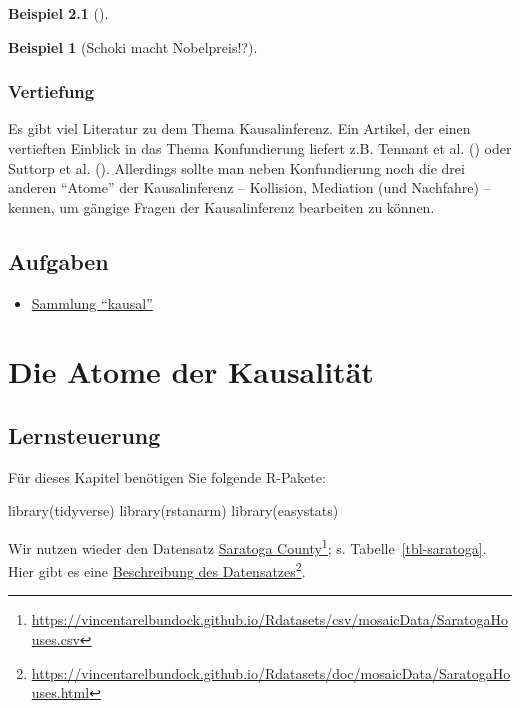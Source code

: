 \documentclass[
  ngerman,
  letterpaper,
  twoside,
  open=any]{scrbook}
\newenvironment{Shaded}{\begin{snugshade}}{\end{snugshade}}
\newcommand{\FunctionTok}[1]{\textcolor[rgb]{0.28,0.35,0.67}{#1}}
\newcommand{\NormalTok}[1]{\textcolor[rgb]{0.00,0.23,0.31}{#1}}
\providecommand{\tightlist}{%
  \setlength{\itemsep}{0pt}\setlength{\parskip}{0pt}}\usepackage{longtable,booktabs,array}
\theoremstyle{definition}
\newtheorem{example}{Beispiel}[chapter]
\theoremstyle{plain}
\theoremstyle{definition}
\theoremstyle{definition}
\theoremstyle{remark}
\begin{document}
\begin{example}[]
\begin{example}[Schoki macht
Nobelpreis!?]
\begin{tcolorbox}
\end{tcolorbox}

\end{example}

\subsection{Vertiefung}\label{vertiefung-6}

Es gibt viel Literatur zu dem Thema Kausalinferenz. Ein Artikel, der
einen vertieften Einblick in das Thema Konfundierung liefert z.B.
Tennant et al. () oder Suttorp et al.
(). Allerdings sollte man neben
Konfundierung noch die drei anderen \enquote{Atome} der Kausalinferenz
-- Kollision, Mediation (und Nachfahre) -- kennen, um gängige Fragen der
Kausalinferenz bearbeiten zu können.

\section{Aufgaben}\label{aufgaben-11}

\begin{itemize}
\tightlist
\item
  \href{https://datenwerk.netlify.app/\#category=causal}{Sammlung
  \enquote{kausal}}
\end{itemize}

\chapter{Die Atome der Kausalität}\label{sec-kausal2}

\section{Lernsteuerung}\label{lernsteuerung-12}

\providecommand{\indep}{\perp \!\!\! \perp}

Für dieses Kapitel benötigen Sie folgende R-Pakete:

\begin{Shaded}
\begin{Highlighting}[]
\FunctionTok{library}\NormalTok{(tidyverse)}
\FunctionTok{library}\NormalTok{(rstanarm)}
\FunctionTok{library}\NormalTok{(easystats)}
\end{Highlighting}
\end{Shaded}

Wir nutzen wieder den Datensatz
\href{https://vincentarelbundock.github.io/Rdatasets/csv/mosaicData/SaratogaHouses.csv}{Saratoga
County}\footnote{\url{https://vincentarelbundock.github.io/Rdatasets/csv/mosaicData/SaratogaHouses.csv}};
s. Tabelle~\ref{tbl-saratoga}. Hier gibt es eine
\href{https://vincentarelbundock.github.io/Rdatasets/doc/mosaicData/SaratogaHouses.html}{Beschreibung
des Datensatzes}\footnote{\url{https://vincentarelbundock.github.io/Rdatasets/doc/mosaicData/SaratogaHouses.html}}.


\end{example}
\end{document}
